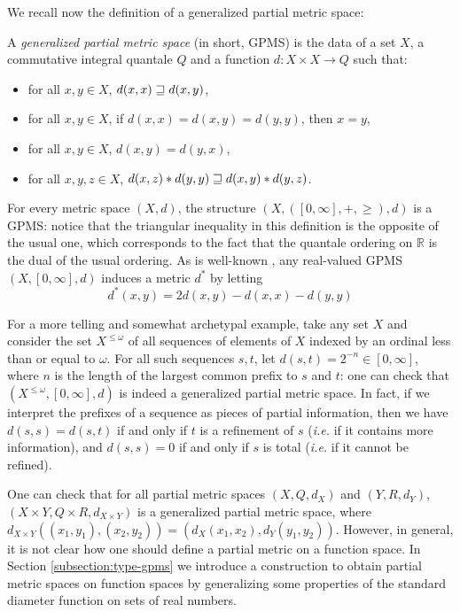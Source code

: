 We recall now the definition of a generalized partial metric space:


\begin{definition} A \emph{generalized partial metric space} (in short, GPMS) is the data of a set $X$, a commutative integral quantale $Q$ and a function $d : X \times X \to Q$ such that: \begin{itemize}
\item for all $x,y \in X$, $d(x,x) \sqsupseteq d(x,y)$,
\item for all $x,y \in X$, if $d(x,x) = d(x,y) = d(y,y)$, then $x = y$,
\item for all $x,y \in X$, $d(x,y) = d(y,x)$,
\item for all $x,y,z \in X$, $d(x,z) \mathbin{\ast} d(y,y) \sqsupseteq d(x,y) \mathbin{\ast} d(y,z)$.
\end{itemize}
\end{definition}

For every metric space $(X,d)$, the structure $(X, ([0,\infty], +, \geq), d)$ is a GPMS: notice that the triangular inequality in this definition is the opposite of the usual one, which corresponds to the fact that the quantale ordering on $\mathbb{R}$ is the dual of the usual ordering. 
As is well-known \cite{bkmp:partial-metrics}, any real-valued GPMS $(X,[0,\infty],d)$ induces a metric $d^{*}$ by letting 
\begin{equation}\label{eq:pmettomet} %
d^{*}(x,y)=2d(x,y)-d(x,x)-d(y,y)\tag{$\star$}
\end{equation}


For a more telling and somewhat archetypal example, take any set $X$ and consider the set $X^{\leq \omega}$ of all sequences of elements of $X$ indexed by an ordinal less than or equal to $\omega$. For all such sequences $s,t$, let $d(s,t) = 2^{-n} \in [0,\infty]$, where $n$ is the length of the largest common prefix to $s$ and $t$: one can check that $(X^{\leq \omega}, [0,\infty], d)$ is indeed a generalized partial metric space. In fact, if we interpret the prefixes of a sequence as pieces of partial information, then we have $d(s,s) = d(s,t)$ if and only if $t$ is a refinement of $s$ (\textit{i.e.} if it contains more information), and $d(s,s) = 0$ if and only if $s$ is total (\textit{i.e.} if it cannot be refined).

One can check that for all partial metric spaces $(X, Q, d_X)$ and $(Y, R, d_Y)$, $(X \times Y, Q \times R, d_{X \times Y})$ is a generalized partial metric space, where $d_{X \times Y}((x_1, y_1), (x_2, y_2)) = (d_X(x_1, x_2), d_Y(y_1, y_2))$. However, in general, it is not clear how one should define a partial metric on a function space. In  Section \ref{subsection:type-gpms} we introduce a construction to obtain partial metric spaces on function spaces by generalizing some properties of the standard diameter function on sets of real numbers.
